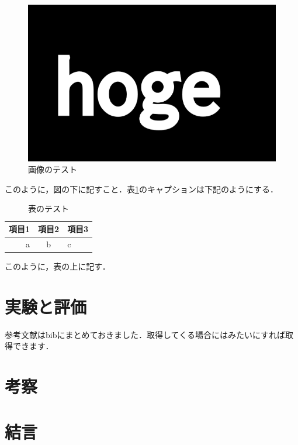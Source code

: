 \documentclass[11pt]{jarticle}
\begin{document}
\begin{figure}[H]%
  \includegraphics[scale=0.5]{hoge.png}
  \caption{画像のテスト}
  \label{fig1}%
\end{figure}

このように，図の下に記すこと．表\ref{tab1}のキャプションは下記のようにする．

\begin{table}[H]
  \caption{表のテスト}
  \begin{center}
  \begin{tabular}{ r  c  p{} } %
    \hline
    項目1 & 項目2 & 項目3 \\
    \hline
    a & b & c \\
    \hline
  \end{tabular}%
  \end{center}
  \label{tab1}
\end{table}

このように，表の上に記す．

\section{実験と評価}
参考文献はbibにまとめておきました．取得してくる場合には\cite{marumaru}\cite{abc}\cite{batubatu}\cite{efghij}みたいにすれば取得できます．

\section{考察}

\section{結言}

\end{document}
